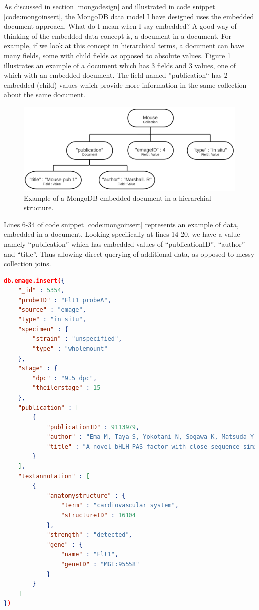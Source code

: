 As discussed in section \ref{mongodesign} and illustrated in code snippet \ref{code:mongoinsert}, the MongoDB data model I have designed uses the embedded document approach. What do I mean when I say embedded? A good way of thinking of the embedded data concept is, a document in a document. For example, if we look at this concept in hierarchical terms, a document can have many fields, some with child fields as opposed to absolute values. Figure \ref{fig:embedded} illustrates an example of a document which has 3 fields and 3 values, one of which with an embedded document. The field named ''publication`` has 2 embedded (child) values which provide more information in the same collection about the same document.\begin{figure}[H]\begin{center}\includegraphics[width=1\linewidth]{images/embeddedex}\caption{Example of a MongoDB embedded document in a hierarchial structure.}\label{fig:embedded}\end{center}\end{figure}
\parindent 0pt
Lines 6-34 of code snippet \ref{code:mongoinsert} represents an example of data, embedded in a document. Looking specifically at lines 14-20, we have a value namely ``publication'' which has embedded values of ``publicationID'', ``author'' and ``title''. Thus allowing direct querying of additional data, as opposed to messy collection joins.
\parindent 15pt
\newpage
\begin{lstlisting}[language=json,caption=Example insertion of data into a MongoDB document., label=code:mongoinsert]
db.emage.insert({
    "_id" : 5354,
    "probeID" : "Flt1 probeA",
    "source" : "emage",
    "type" : "in situ",
    "specimen" : {
        "strain" : "unspecified",
        "type" : "wholemount"
    },
    "stage" : {
        "dpc" : "9.5 dpc",
        "theilerstage" : 15
    },
    "publication" : [ 
        {
            "publicationID" : 9113979,
            "author" : "Ema M, Taya S, Yokotani N, Sogawa K, Matsuda Y, Fujii-Kuriyama Y",
            "title" : "A novel bHLH-PAS factor with close sequence similarity to hypoxia-inducible factor 1alpha regulates the VEGF expression and is potentially involved in lung and vascular development."
        }
    ],
    "textannotation" : [ 
        {
            "anatomystructure" : {
                "term" : "cardiovascular system",
                "structureID" : 16104
            },
            "strength" : "detected",
            "gene" : {
                "name" : "Flt1",
                "geneID" : "MGI:95558"
            }
        }
    ]
})
\end{lstlisting} 


